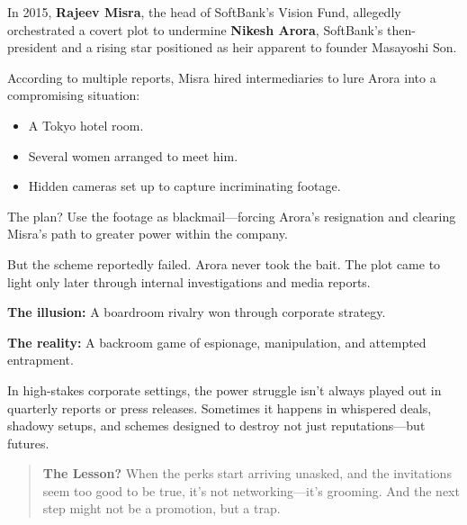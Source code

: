 \begin{tcolorbox}[colback=blue!5!white, colframe=blue!50!black, breakable,
  title={Historical Sidebar: The SoftBank Vision Fund Blackmail Plot (2015)}]

In 2015, \textbf{Rajeev Misra}, the head of SoftBank’s Vision Fund, allegedly orchestrated a covert plot to undermine \textbf{Nikesh Arora}, SoftBank’s then-president and a rising star positioned as heir apparent to founder Masayoshi Son.

\medskip

According to multiple reports, Misra hired intermediaries to lure Arora into a compromising situation:  

\medskip

\begin{itemize}
  \item A Tokyo hotel room.
  \item Several women arranged to meet him.
  \item Hidden cameras set up to capture incriminating footage.
\end{itemize}

The plan?  Use the footage as blackmail—forcing Arora’s resignation and clearing Misra’s path to greater power within the company.

\medskip

But the scheme reportedly failed. Arora never took the bait. The plot came to light only later through internal investigations and media reports.

\medskip

\textbf{The illusion:} A boardroom rivalry won through corporate strategy.

\medskip

\textbf{The reality:} A backroom game of espionage, manipulation, and attempted entrapment.

\medskip

In high-stakes corporate settings, the power struggle isn’t always played out in quarterly reports or press releases. Sometimes it happens in whispered deals, shadowy setups, and schemes designed to destroy not just reputations—but futures.

\medskip

\begin{quote}
\textbf{The Lesson?} When the perks start arriving unasked, and the invitations seem too good to be true, it’s not networking—it’s grooming. And the next step might not be a promotion, but a trap.
\end{quote}

\end{tcolorbox}

